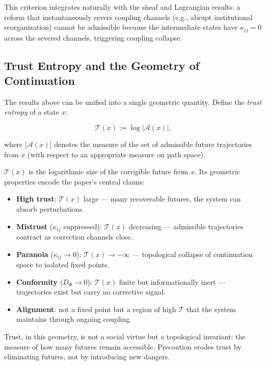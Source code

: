 \documentclass[11pt,a4paper]{article}
\theoremstyle{definition}
\theoremstyle{plain}
\begin{document}
\begin{mdframed}[style=appendixbox]
This criterion integrates naturally with the sheaf and Lagrangian results: a reform that instantaneously severs coupling channels (e.g., abrupt institutional reorganization) cannot be admissible because the intermediate states have $\kappa_{ij} = 0$ across the severed channels, triggering coupling collapse.

\subsection{Trust Entropy and the Geometry of Continuation}

The results above can be unified into a single geometric quantity. Define the \emph{trust entropy} of a state $x$:

\begin{equation}
\mathcal{T}(x) := \log |\mathcal{A}(x)|,
\end{equation}

where $|\mathcal{A}(x)|$ denotes the measure of the set of admissible future trajectories from $x$ (with respect to an appropriate measure on path space).

$\mathcal{T}(x)$ is the logarithmic size of the corrigible future from $x$. Its geometric properties encode the paper's central claims:

\begin{itemize}
\item \textbf{High trust}: $\mathcal{T}(x)$ large --- many recoverable futures, the system can absorb perturbations.
\item \textbf{Mistrust} ($\kappa_{ij}$ suppressed): $\mathcal{T}(x)$ decreasing --- admissible trajectories contract as correction channels close.
\item \textbf{Paranoia} ($\kappa_{ij} \to 0$): $\mathcal{T}(x) \to -\infty$ --- topological collapse of continuation space to isolated fixed points.
\item \textbf{Conformity} ($D_\Phi \to 0$): $\mathcal{T}(x)$ finite but informationally inert --- trajectories exist but carry no corrective signal.
\item \textbf{Alignment}: not a fixed point but a region of high $\mathcal{T}$ that the system maintains through ongoing coupling.
\end{itemize}

Trust, in this geometry, is not a social virtue but a topological invariant: the measure of how many futures remain accessible. Precaution erodes trust by eliminating futures, not by introducing new dangers.

\end{mdframed}
\end{document}

